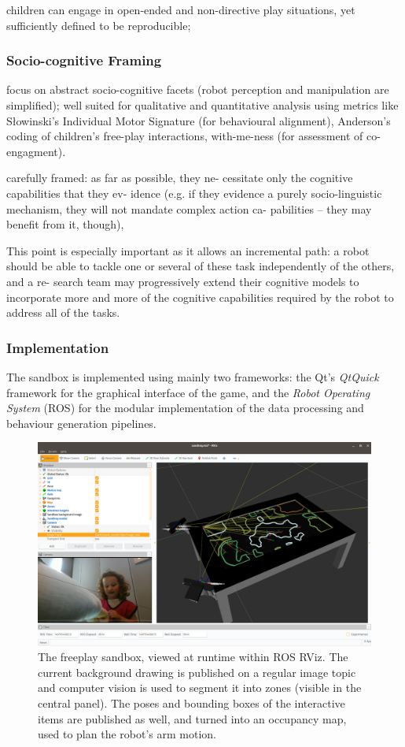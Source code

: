 \documentclass{article}
\begin{document}
children can engage in open-ended and
non-directive play situations, yet sufficiently
defined to be reproducible; 

\subsubsection{Socio-cognitive Framing}

focus on abstract socio-cognitive facets (robot
perception and manipulation are simplified); well suited for qualitative and
quantitative analysis using metrics like Słowinski’s Individual Motor Signature
(for behavioural alignment), Anderson's~\cite{anderson2004social} coding of children’s free-play
interactions, with-me-ness (for assessment of co-engagment).

carefully framed: as far as possible, they ne-
cessitate only the cognitive capabilities that they ev-
idence (e.g. if they evidence a purely socio-linguistic
mechanism, they will not mandate complex action ca-
pabilities – they may benefit from it, though),

This point is especially important as it allows an
incremental path: a robot should be able to tackle one or
several of these task independently of the others, and a re-
search team may progressively extend their cognitive models
to incorporate more and more of the cognitive capabilities
required by the robot to address all of the tasks.



\subsubsection{Implementation}

The sandbox is implemented using mainly two frameworks: the Qt's \emph{QtQuick} framework
for the graphical interface of the game, and the \emph{Robot Operating System}
(ROS) for the modular implementation of the data processing and behaviour
generation pipelines.

\begin{figure}
    \centering
    \includegraphics[width=0.9\linewidth]{rviz-sandtray}
    \caption{The freeplay sandbox, viewed at runtime within ROS RViz. The
    current background drawing is published on a regular image
    topic and computer vision is used to segment it into zones (visible in
    the central panel). The poses and bounding boxes of the interactive items
    are published as well, and turned into an occupancy map, used to plan the
    robot's arm motion.}
    \label{fig|rviz}
\end{figure}
\end{document}

